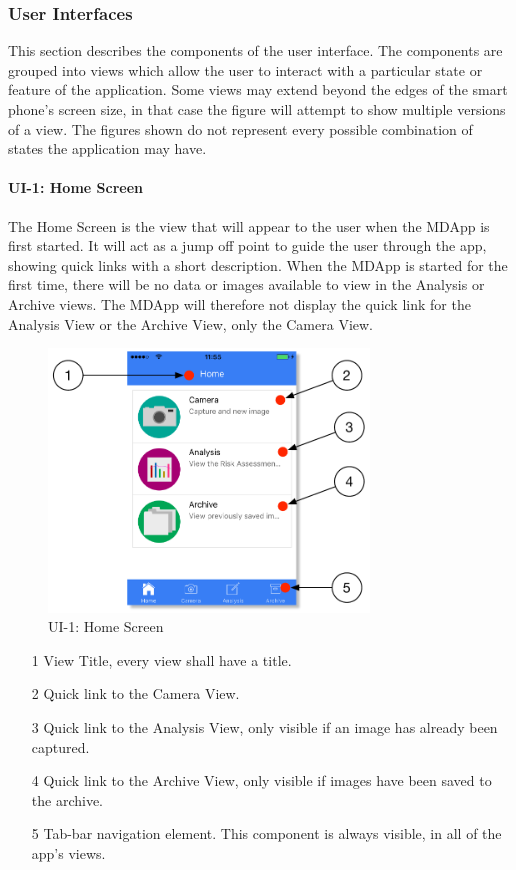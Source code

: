 \subsubsection{User Interfaces}

            This section describes the components of the user interface. The components are grouped into views which allow the user to interact with a particular state or feature of the application. Some views may extend beyond the edges of the smart phone's screen size, in that case the figure will attempt to show multiple versions of a view. The figures shown do not represent every possible combination of states the application may have.

            \paragraph{UI-1: Home Screen}

            The Home Screen is the view that will appear to the user when the MDApp is first started. It will act as a jump off point to guide the user through the app, showing quick links with a short description. When the MDApp is started for the first time, there will be no data or images available to view in the Analysis or Archive views. The MDApp will therefore not display the quick link for the Analysis View or the Archive View, only the Camera View.

                \begin{figure}[H]
                    \centering
                    \includegraphics[height=7cm]{assets/GUI/HOME_01.pdf}
                    \caption{UI-1: Home Screen}
                    \label{fig:ui-1}
                \end{figure}

                \begin{itemize}
                    \item[1] View Title, every view shall have a title.
                    \item[2] Quick link to the Camera View.
                    \item[3] Quick link to the Analysis View, only visible if an image has already been captured.
                    \item[4] Quick link to the Archive View, only visible if images have been saved to the archive.
                    \item[5] Tab-bar navigation element. This component is always visible, in all of the app’s views.
                \end{itemize}

